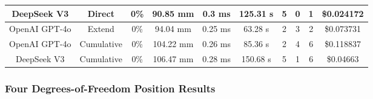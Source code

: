 \begin{landscape}
\begin{table}[H]
\begin{center}
\begin{tabular}{|c|c|c|c|c|c|c|c|c|c|}
    \hline
    DeepSeek V3 & Direct & 0\% & 90.85 mm & 0.3 ms & 125.31 s & 5 & 0 & 1 & \$0.024172 \\
    \hline
    OpenAI GPT-4o & Extend & 0\% & 94.04 mm & 0.25 ms & 63.28 s & 2 & 3 & 2 & \$0.073731 \\
    \hline
    OpenAI GPT-4o & Cumulative & 0\% & 104.22 mm & 0.26 ms & 85.36 s & 2 & 4 & 6 & \$0.118837 \\
    \hline
    DeepSeek V3 & Cumulative & 0\% & 106.47 mm & 0.28 ms & 150.68 s & 5 & 1 & 6 & \$0.04663 \\
    \hline
\end{tabular}
\label{Results-Position-4-6}
\end{center}
\end{table}

\subsubsection{Four Degrees-of-Freedom Position Results}


\end{landscape}
